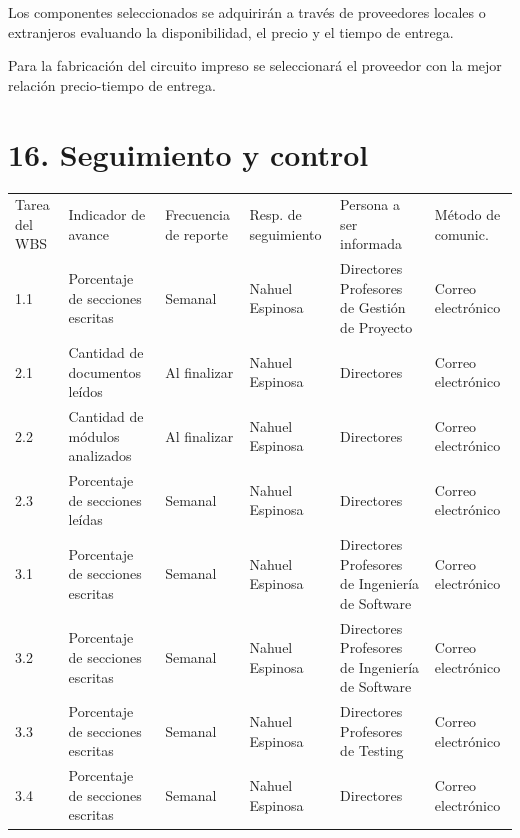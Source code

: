 \documentclass[11pt]{charter}
\begin{document}
Los componentes seleccionados se adquirirán a través de proveedores locales o extranjeros evaluando la disponibilidad, el precio y el tiempo de entrega.

Para la fabricación del circuito impreso se seleccionará el proveedor con la mejor relación precio-tiempo de entrega.

\section{16. Seguimiento y control}
\label{sec:seguimiento}

\begin{table}[!htpb]
\centering
\begin{tabularx}{\linewidth}{@{}|m{1.5cm}|m{3cm}|X|X|X|X|@{}}
\hline
\rowcolor[HTML]{C0C0C0} 
\multicolumn{6}{|c|}{\cellcolor[HTML]{C0C0C0}SEGUIMIENTO DE AVANCE} \\ \hline
\rowcolor[HTML]{C0C0C0} 
Tarea del WBS & Indicador de avance & Frecuencia de reporte & Resp. de seguimiento & Persona a ser informada & Método de comunic. \\ \hline
 1.1  & Porcentaje de secciones escritas                   & Semanal      & Nahuel Espinosa & Directores Profesores de Gestión de Proyecto & Correo electrónico \\ \hline
 2.1  & Cantidad de documentos leídos                      & Al finalizar & Nahuel Espinosa & Directores & Correo electrónico \\ \hline
 2.2  & Cantidad de módulos analizados                     & Al finalizar & Nahuel Espinosa & Directores & Correo electrónico \\ \hline
 2.3  & Porcentaje de secciones leídas                     & Semanal      & Nahuel Espinosa & Directores & Correo electrónico \\ \hline
 3.1  & Porcentaje de secciones escritas                   & Semanal      & Nahuel Espinosa & Directores Profesores de Ingeniería de Software & Correo electrónico \\ \hline
 3.2  & Porcentaje de secciones escritas                   & Semanal      & Nahuel Espinosa & Directores Profesores de Ingeniería de Software & Correo electrónico \\ \hline
 3.3  & Porcentaje de secciones escritas                   & Semanal      & Nahuel Espinosa & Directores Profesores de Testing & Correo electrónico \\ \hline
 3.4  & Porcentaje de secciones escritas                   & Semanal      & Nahuel Espinosa & Directores & Correo electrónico \\ \hline

\end{tabularx}
\end{table}
\end{document}
